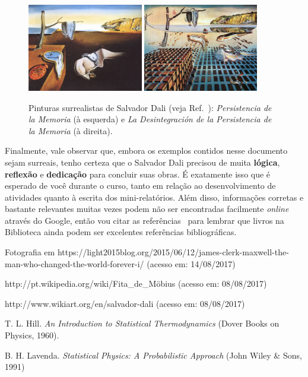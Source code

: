 \documentclass[a4wide]{report}
\begin{document}
\begin{figure}[h]
\centering
\includegraphics[width=0.45\textwidth]{fig2a_the-persistence-of-memory}%
\includegraphics[width=0.447\textwidth]{fig2b_the-disintegration-of-the-persistence-of-memory}
\caption{Pinturas surrealistas de Salvador Dali (veja Ref.~\cite{dali_paintings}): {\it Persistencia de 
la Memoria} (à esquerda) e  {\it La Desintegración de la Persistencia de la Memoria}
(à direita).}
\label{pinturas_de_Dali}
\end{figure}

Finalmente, vale observar que, embora os exemplos contidos nesse documento sejam surreais, 
tenho certeza que o Salvador Dali precisou de muita {\bf lógica}, {\bf reflexão} e 
{\bf dedicação} para concluir suas obras. 
	É exatamente isso que é esperado de você durante o curso, tanto em relação ao 
desenvolvimento de atividades quanto à escrita dos mini-relatórios.
	Além disso, informações corretas e bastante relevantes muitas vezes podem não ser 
encontradas facilmente {\it online} através do Google, então vou citar as 
referências~\cite{hill,lavenda} para lembrar que livros na Biblioteca ainda podem ser 
excelentes referências bibliográficas.





\begin{thebibliography}{99}

 Fotografia em https://light2015blog.org/2015/06/12/james-clerk-maxwell-the-man-who-changed-the-world-forever-i/ (acesso em: 14/08/2017)

 http://pt.wikipedia.org/wiki/Fita\_de\_M\"obius (acesso em: 08/08/2017)

 http://www.wikiart.org/en/salvador-dali (acesso em: 08/08/2017)

 T. L. Hill. {\it An Introduction to Statistical Thermodynamics} (Dover Books on Physics, 1960).

 B. H. Lavenda. {\it Statistical Physics: A Probabilistic Approach} (John Wiley \& Sons, 1991)


\end{thebibliography}
\end{document}
